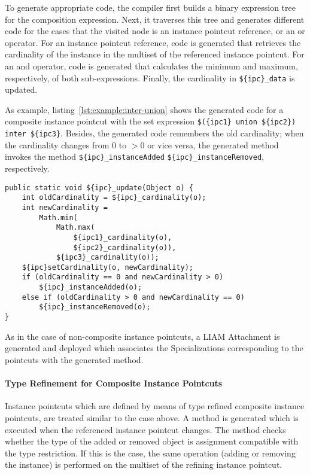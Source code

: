 To generate appropriate code, the compiler first builds a binary expression tree for the composition expression.
Next, it traverses this tree and generates different code for the cases that the visited node is an instance pointcut reference, or an  or  operator.
For an instance pointcut reference, code is generated that retrieves the cardinality of the instance in the multiset of the referenced instance pointcut.
For an  and  operator, code is generated that calculates the minimum and maximum, respectively, of both sub-expressions. Finally, the cardinality in \lstinline!${ipc}_data! is updated. 

As example, listing~\ref{lst:example:inter-union} shows the generated code for a composite instance pointcut with the set expression \lstinline!$({ipc1} union ${ipc2}) inter ${ipc3}!. Besides, the generated code remembers the old cardinality; when the cardinality changes from $0$ to $>0$ or vice versa, the generated method invokes the method \lstinline!${ipc}_instanceAdded! \lstinline!${ipc}_instanceRemoved!, respectively. 

\begin{lstlisting}[float,caption={The update method generated from a composition expression},label=lst:example:inter-union]
public static void ${ipc}_update(Object o) {
	int oldCardinality = ${ipc}_cardinality(o);
	int newCardinality =
		Math.min(
			Math.max(
				${ipc1}_cardinality(o),
				${ipc2}_cardinality(o)),
			${ipc3}_cardinality(o));
	${ipc}setCardinality(o, newCardinality);
	if (oldCardinality == 0 and newCardinality > 0)
		${ipc}_instanceAdded(o);
	else if (oldCardinality > 0 and newCardinality == 0)
		${ipc}_instanceRemoved(o);
}
\end{lstlisting}

As in the case of non-composite instance pointcuts, a LIAM Attachment is generated and deployed which associates the Specializations corresponding to the pointcuts with the generated method.

\paragraph{Type Refinement for Composite Instance Pointcuts}

Instance pointcuts which are defined by means of type refined composite instance pointcuts, are treated similar to the case above.
A method is generated which is executed when the referenced instance pointcut changes.
The method checks whether the type of the added or removed object is assignment compatible with the type restriction.
If this is the case, the same operation (adding or removing the instance) is performed on the multiset of the refining instance pointcut.

